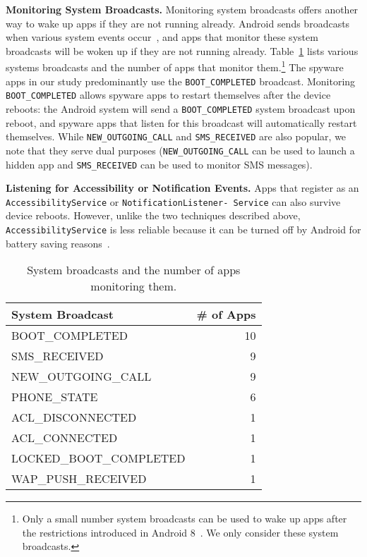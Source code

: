 \textbf{Monitoring System Broadcasts.} Monitoring system broadcasts offers another way to wake up apps if they are not running already. Android sends broadcasts when various system events occur~\cite{Broadcas25:online}, and apps that monitor these system broadcasts will be woken up if they are not running already. Table~\ref{tab:monitor_broadcast} lists various systems broadcasts and the number of apps that monitor them.\footnote{Only a small number system broadcasts can be used to wake up apps after the restrictions introduced in Android 8~\cite{Implicit72:online}. We only consider these system broadcasts.} The spyware apps in our study predominantly use the \texttt{BOOT\_COMPLETED} broadcast. Monitoring
\texttt{BOOT\_COMPLETED} allows spyware apps to restart themselves
after the device reboots: the Android system will send a
\texttt{BOOT\_COMPLETED} system broadcast upon reboot, and spyware apps that listen
for this broadcast will automatically restart themselves. While \texttt{NEW\_OUTGOING\_CALL} and \texttt{SMS\_RECEIVED} are also popular, we note that they serve dual purposes (\texttt{NEW\_OUTGOING\_CALL} can be used to launch a hidden app and \texttt{SMS\_RECEIVED} can be used to monitor SMS messages).

\textbf{Listening for Accessibility or Notification Events.} Apps that register as an
\texttt{AccessibilityService} or
\texttt{NotificationListener- Service}
can also survive device
reboots. However, unlike the two techniques described above,
\texttt{AccessibilityService}
is less reliable because it can be
turned off by Android for battery saving reasons~\cite{AndroidA0:online,Accessib46:online}.


\begin{table}[t]
  \centering
  \begin{tabular}{lr}
    System Broadcast         &\# of Apps  \\
    \midrule
    BOOT\_COMPLETED          &10          \\
    SMS\_RECEIVED            &9           \\
    NEW\_OUTGOING\_CALL      &9           \\
    PHONE\_STATE             &6           \\
    ACL\_DISCONNECTED        &1           \\
    ACL\_CONNECTED           &1           \\
    LOCKED\_BOOT\_COMPLETED  &1           \\
    WAP\_PUSH\_RECEIVED      &1           \\
  \end{tabular}
  \caption{System broadcasts and the number of apps monitoring them.\label{tab:monitor_broadcast}}
\end{table}

